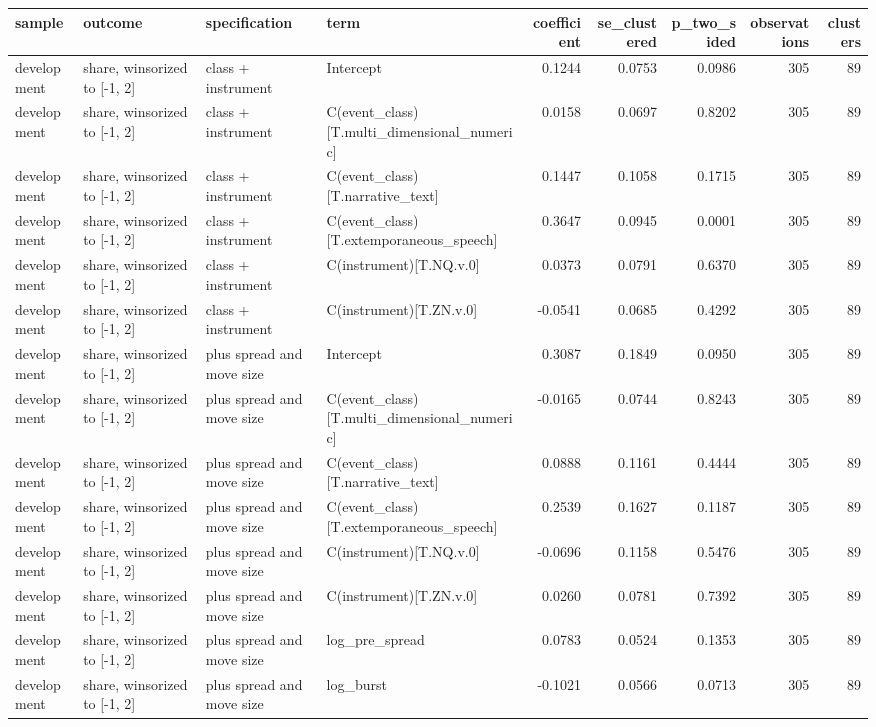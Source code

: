 \begin{tabular}{llllrrrrr}
\toprule
sample & outcome & specification & term & coefficient & se_clustered & p_two_sided & observations & clusters \\
\midrule
development & share, winsorized to [-1, 2] & class + instrument & Intercept & 0.1244 & 0.0753 & 0.0986 & 305 & 89 \\
development & share, winsorized to [-1, 2] & class + instrument & C(event_class)[T.multi_dimensional_numeric] & 0.0158 & 0.0697 & 0.8202 & 305 & 89 \\
development & share, winsorized to [-1, 2] & class + instrument & C(event_class)[T.narrative_text] & 0.1447 & 0.1058 & 0.1715 & 305 & 89 \\
development & share, winsorized to [-1, 2] & class + instrument & C(event_class)[T.extemporaneous_speech] & 0.3647 & 0.0945 & 0.0001 & 305 & 89 \\
development & share, winsorized to [-1, 2] & class + instrument & C(instrument)[T.NQ.v.0] & 0.0373 & 0.0791 & 0.6370 & 305 & 89 \\
development & share, winsorized to [-1, 2] & class + instrument & C(instrument)[T.ZN.v.0] & -0.0541 & 0.0685 & 0.4292 & 305 & 89 \\
development & share, winsorized to [-1, 2] & plus spread and move size & Intercept & 0.3087 & 0.1849 & 0.0950 & 305 & 89 \\
development & share, winsorized to [-1, 2] & plus spread and move size & C(event_class)[T.multi_dimensional_numeric] & -0.0165 & 0.0744 & 0.8243 & 305 & 89 \\
development & share, winsorized to [-1, 2] & plus spread and move size & C(event_class)[T.narrative_text] & 0.0888 & 0.1161 & 0.4444 & 305 & 89 \\
development & share, winsorized to [-1, 2] & plus spread and move size & C(event_class)[T.extemporaneous_speech] & 0.2539 & 0.1627 & 0.1187 & 305 & 89 \\
development & share, winsorized to [-1, 2] & plus spread and move size & C(instrument)[T.NQ.v.0] & -0.0696 & 0.1158 & 0.5476 & 305 & 89 \\
development & share, winsorized to [-1, 2] & plus spread and move size & C(instrument)[T.ZN.v.0] & 0.0260 & 0.0781 & 0.7392 & 305 & 89 \\
development & share, winsorized to [-1, 2] & plus spread and move size & log_pre_spread & 0.0783 & 0.0524 & 0.1353 & 305 & 89 \\
development & share, winsorized to [-1, 2] & plus spread and move size & log_burst & -0.1021 & 0.0566 & 0.0713 & 305 & 89 \\

\end{tabular}
